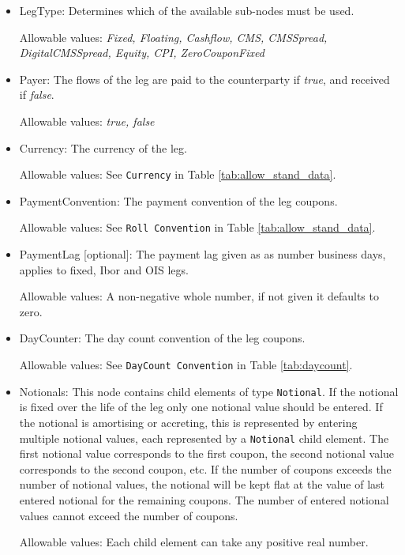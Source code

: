 \begin{itemize}
\item LegType:  Determines which of the available sub-nodes must be
  used. 

Allowable values:  \emph{Fixed, Floating, Cashflow, CMS, CMSSpread, DigitalCMSSpread, Equity, CPI, ZeroCouponFixed}

\item Payer:  The flows of the leg are paid to the counterparty if
  \emph{true}, and received if \emph{false}.  

Allowable values:  \emph{true, false} 

\item Currency: The currency of the leg. 

Allowable values:  See \lstinline!Currency! in Table \ref{tab:allow_stand_data}.

\item PaymentConvention: The payment convention of the leg coupons. 

Allowable values: See \lstinline!Roll Convention! in Table \ref{tab:allow_stand_data}.

\item PaymentLag [optional]: The payment lag given as as number business days, applies to fixed, Ibor and OIS legs.

Allowable values: A non-negative whole number, if not given it defaults to zero.

\item DayCounter: The day count convention of the leg coupons. 

Allowable values: See \lstinline!DayCount Convention! in Table \ref{tab:daycount}.

\item Notionals: This node contains child elements of type
  \lstinline!Notional!. If the notional is fixed over the life of the
  leg only one notional value should be entered. If the notional is
  amortising or accreting, this is represented by entering multiple
  notional values, each represented by a \lstinline!Notional! child
  element. The first notional value corresponds to the first coupon,
  the second notional value corresponds to the second coupon, etc. If
  the number of coupons exceeds the number of notional values, the
  notional will be kept flat at the value of last entered notional for
  the remaining coupons.  The number of entered notional values cannot
  exceed the number of coupons.

Allowable values: Each child element can take any positive real number.


\end{itemize}
